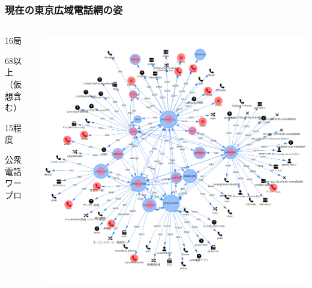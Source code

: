 \documentclass[
  lualatex,
  aspectratio=169,
  14pt
]{beamer}
\begin{document}
\begin{frame}
  \frametitle{現在の東京広域電話網の姿}

  \begin{columns}
    \begin{column}{.25\textwidth}
      \begin{description}[labelwidth=\linewidth]
        \item[交換局数]
          16局
        \item[端末数]
          68以上\\
          （仮想含む）
        \item[黒電話の数]
          15程度
        \item[その他]
          公衆電話\\
          ワープロ
      \end{description}
      ~
    \end{column}
    \begin{column}{.7\textwidth}
      \centering
      \includegraphics[height=\textheight]{./images/mantela2.png}
    \end{column}
  \end{columns}
\end{frame}
\end{document}

